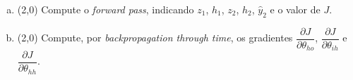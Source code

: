 \documentclass[11pt,a4paper]{article}
\begin{document}
\begin{enumerate}[1)]
\begin{enumerate}[a)]
    \item (2{,}0) Compute o \textit{forward pass}, indicando $z_1$, $h_1$, $z_2$, $h_2$, $\hat{y}_2$ e o valor de $J$.
    \vspace{4.5cm}

    \item (2{,}0) Compute, por \textit{backpropagation through time}, os gradientes $\dfrac{\partial J}{\partial \theta_{ho}}$, $\dfrac{\partial J}{\partial \theta_{ih}}$ e $\dfrac{\partial J}{\partial \theta_{hh}}$.
    \vspace{7.5cm}
\end{enumerate}

\end{enumerate}
\end{document}
